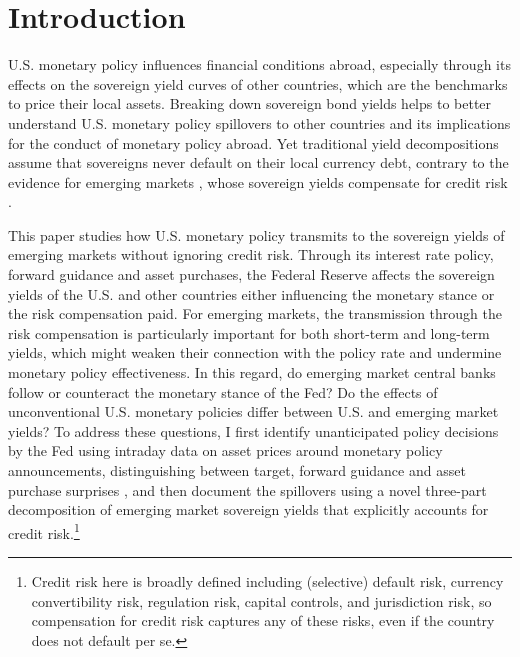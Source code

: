 \documentclass[a4paper, 12pt]{article}
\begin{document}
\section{Introduction}
U.S. monetary policy influences financial conditions abroad, especially through its effects on the sovereign yield curves of other countries, which are the benchmarks to price their local assets. Breaking down sovereign bond yields helps to better understand  U.S. monetary policy spillovers to other countries and its implications for the conduct of monetary policy abroad. Yet traditional yield decompositions assume that sovereigns never default on their local currency debt, contrary to the evidence for emerging markets \citep{ReinhartRogoff:2011,JeanneretSouissi:2016,BeersJonesWalsh:2020}, whose sovereign yields compensate for credit risk \citep{DuSchreger:2016JoF}. 

This paper studies how U.S. monetary policy transmits to the sovereign yields of emerging markets without ignoring credit risk. Through its interest rate policy, forward guidance and asset purchases, the Federal Reserve affects the sovereign yields of the U.S. and other countries either influencing the monetary stance or the risk compensation paid. For emerging markets, the transmission through the risk compensation is particularly important for both short-term \citep{Kalemli-Ozcan:2019} and long-term \citep{Obstfeld:2015} yields, which might weaken their connection with the policy rate and undermine monetary policy effectiveness. In this regard, do emerging market central banks follow or counteract the monetary stance of the Fed? Do the effects of unconventional U.S. monetary policies differ between U.S. and emerging market yields? To address these questions, I first identify unanticipated policy decisions by the Fed using intraday data on asset prices around monetary policy announcements, distinguishing between target, forward guidance and asset purchase surprises \citep{GSS:2005a,Swanson:2021}, and then document the spillovers using a novel three-part decomposition of emerging market sovereign yields that explicitly accounts for credit risk.\footnote{ Credit risk here is broadly defined including (selective) default risk, currency convertibility risk, regulation risk, capital controls, and jurisdiction risk, so compensation for credit risk captures any of these risks, even if the country does not default per se.} 
\end{document}
